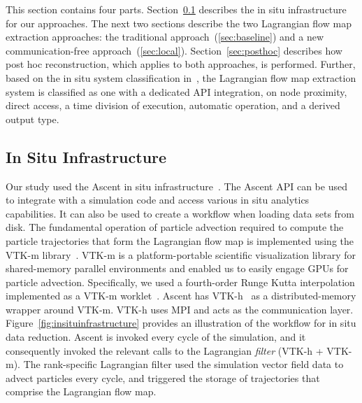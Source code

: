This section contains four parts.
%
Section~\ref{sec:insituinfrastructure} describes the in situ infrastructure for our approaches.
%
The next two sections describe the two Lagrangian flow map extraction approaches:
the traditional approach~(\ref{sec:baseline}) and a new communication-free approach~(\ref{sec:local}).
%
Section~\ref{sec:posthoc} describes how post hoc reconstruction, which applies to both approaches, is performed.
%
%
Further, based on the in situ system classification in~\cite{childs2020istp}, the Lagrangian flow map extraction system is classified as one with a dedicated API integration, on node proximity, direct access, a time division of execution, automatic operation, and a derived output type.

\subsection{In Situ Infrastructure}
\label{sec:insituinfrastructure}
Our study used the Ascent in situ infrastructure~\cite{Larsen2017Ascent}.
%
The Ascent API can be used to integrate with a simulation code and access various in situ analytics capabilities.
%
It can also be used to create a workflow when loading data sets from disk.
%
The fundamental operation of particle advection required to compute the particle trajectories that form the Lagrangian flow map is implemented using the VTK-m library~\cite{moreland2016vtk}.
%
VTK-m is a platform-portable scientific visualization library for shared-memory parallel environments and enabled us to easily engage GPUs for particle advection.
%
Specifically, we used a fourth-order Runge Kutta interpolation implemented as a VTK-m worklet~\cite{pugmire2018performance}.
%
Ascent has VTK-h~\cite{Larsen2017Ascent} as a distributed-memory wrapper around VTK-m.
%
VTK-h uses MPI and acts as the communication layer.
%
Figure~\ref{fig:insituinfrastructure} provides an illustration of the workflow for in situ data reduction.
%
Ascent is invoked every cycle of the simulation, and it consequently invoked the relevant calls to the Lagrangian \textit{filter} (VTK-h + VTK-m).
%
The rank-specific Lagrangian filter used the simulation vector field data to advect particles every cycle, and triggered the storage of trajectories that comprise the Lagrangian flow map. 
%



